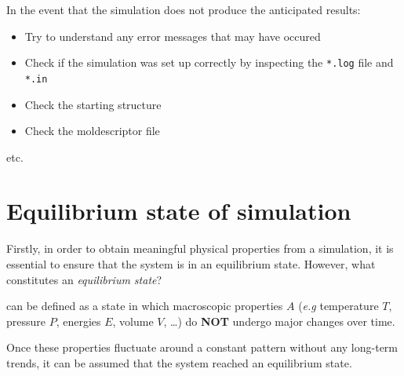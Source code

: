 \documentclass[
  letterpaper,
]{article}
\begin{document}

In the event that the simulation does not produce the anticipated
results:

\begin{itemize}
\item[$\square$]
  Try to understand any error messages that may have occured
\item[$\square$]
  Check if the simulation was set up correctly by inspecting the
  \texttt{*.log} file and \texttt{*.in}
\item[$\square$]
  Check the starting structure
\item[$\square$]
  Check the moldescriptor file
\end{itemize}

etc.

\hypertarget{equilibrium-state-of-simulation}{%
\section*{Equilibrium state of
simulation}\label{equilibrium-state-of-simulation}}


Firstly, in order to obtain meaningful physical properties from a
simulation, it is essential to ensure that the system is in an
equilibrium state. However, what constitutes an \emph{equilibrium
state}?

\begin{tcolorbox}[enhanced jigsaw, toptitle=1mm, opacitybacktitle=0.6, colframe=quarto-callout-important-color-frame, toprule=.15mm, breakable, bottomrule=.15mm, left=2mm, title=\textcolor{quarto-callout-important-color}{\faExclamation}\hspace{0.5em}{An equilibrium state:}, titlerule=0mm, leftrule=.75mm, bottomtitle=1mm, coltitle=black, arc=.35mm, rightrule=.15mm, opacityback=0, colback=white, colbacktitle=quarto-callout-important-color!10!white]

can be defined as a state in which macroscopic properties \(A\)
(\emph{e.g} temperature \(T\), pressure \(P\), energies \(E\), volume
\(V\), \ldots) do \textbf{NOT} undergo major changes over time.

\end{tcolorbox}

Once these properties fluctuate around a constant pattern without any
long-term trends, it can be assumed that the system reached an
equilibrium state.
\end{document}
